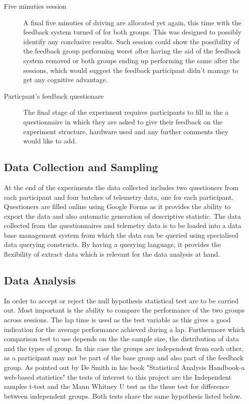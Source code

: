 \begin{description}
	\item[Five minuties session] A final five minuties of driving are allocated yet again, this time with the feedback system turned of for both groups. This was designed to possibly identify any conclusive results. Such session could show the possibility of the feedback group performing worst after having the aid of the feedback system removed or both groups ending up performing the same after the sessions, which would suggest the feedback participant didn't manage to get any cognitive advantage.
	
	\item[Particpant's feedback questionare] The final stage of the experiment requires participants to fill in the a questionnaire  in which they are asked to give their feedback on the experiment structure, hardware used and any further comments they would like to add.
	
\end{description}

\subsection{Data Collection and Sampling}
\label{sec:meth-data-gathering}
At the end of the experiments the data collected includes two questioners from each participant and four batches of telemetry data, one for each participant. Questioners are filled online using Google Forms as it provides the ability to export the data and also automatic generation of descriptive statistic. The data collected from the questionnaires and telemetry data is to be loaded into a data base management system from which the data can be queried using specialised data querying constructs. By having a querying language, it provides the flexibility of extract data which is relevant for the data analysis at hand.

\subsection{Data Analysis}
\label{sec:meth-data-analysis}
In order to accept or reject the null hypothesis statistical test are to be carried out. Most important is the ability to compare the performance of the two groups across sessions. The lap time is used as the test variable as this gives a good indication for the average performance achieved during a lap. Furthermore which comparison test to use depends on the the sample size, the distribution of data and the types of group. In this case the groups are independent from each other, as a participant may not be part of the base group and also part of the feedback group. As pointed out by De Smith in his book "Statistical Analysis Handbook-a web-based statistics" the tests of interest to this project are the Independent samples t-test\cite{de2015statsref} and the Mann Whitney U test\cite{de2015statsref} as the these test for difference between independent groups. Both tests share the same hypothesis listed below.

